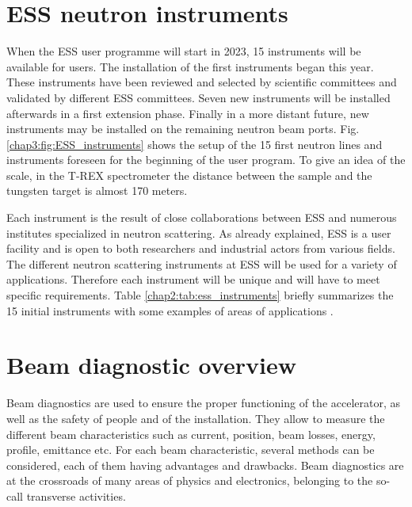 \begin{refsection}
  \section{ESS neutron instruments}

  When the ESS user programme will start in 2023, 15 instruments will be available for users. The installation of the first instruments began this year. These instruments have been reviewed and selected by scientific committees and validated by different ESS committees. Seven new instruments will be installed afterwards in a first extension phase. Finally in a more distant future, new instruments may be installed on the remaining neutron beam ports. Fig. \ref{chap3:fig:ESS_instruments} shows the setup of the 15 first neutron lines and instruments foreseen for the beginning of the user program. To give an idea of the scale, in the T-REX spectrometer the distance between the sample and the tungsten target is almost 170 meters.

  Each instrument is the result of close collaborations between ESS and numerous institutes specialized in neutron scattering. As already explained, ESS is a user facility and is open to both researchers and industrial actors from various fields. The different neutron scattering instruments at ESS will be used for a variety of applications. Therefore each instrument will be unique and will have to meet specific requirements. Table \ref{chap2:tab:ess_instruments} briefly summarizes the 15 initial instruments with some examples of areas of applications \cite{essInstrument,essInstrument2}.

  
  \vspace{1cm}

  

  \FloatBarrier
  \section{Beam diagnostic overview}
  Beam diagnostics are used to ensure the proper functioning of the accelerator, as well as the safety of people and of the installation. They allow to measure the different beam characteristics such as current, position, beam losses, energy, profile, emittance etc. For each beam characteristic, several methods can be considered, each of them having advantages and drawbacks. Beam diagnostics are at the crossroads of many areas of physics and electronics, belonging to the so-call transverse activities.


\end{refsection}
